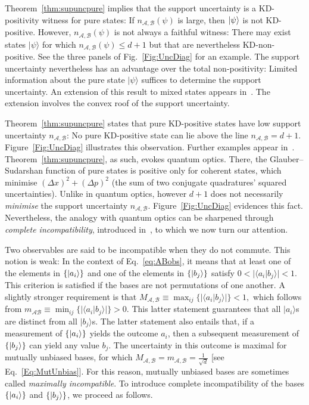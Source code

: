 \documentclass[%
 reprint,
superscriptaddress,
nofootinbib,
bibnotes,
 amsmath,amssymb,
 aps,
]{revtex4-1}
\theoremstyle{plain}
\newcommand{\cket}[1]{|#1\rangle}
\newcommand{\Acal}{{\mathcal A}}
\newcommand{\Bcal}{{\mathcal B}}
\newcommand{\nab}{n_{\Acal,\Bcal}}
\newcommand{\mab}{m_{\Acal,\Bcal}}
\newcommand{\Mab}{M_{\Acal, \Bcal}}
\begin{document}
Theorem~\ref{thm:supuncpure} implies that the support uncertainty is a KD-positivity witness for pure states: If  $\nab (\psi)$ is large, then $\ket{\psi}$ is not KD-positive.  However, $\nab (\psi)$ is not always a faithful witness: There may exist states $|\psi\rangle$ for which $\nab(\psi)\leq d+ 1$ but that are nevertheless KD-non-positive. See the three panels of Fig.~\ref{Fig:UncDiag} for an example. The support uncertainty nevertheless has an advantage over the total non-positivity: Limited information about the pure state $\cket{\psi}$ suffices to determine the support uncertainty. 
An extension of this result to mixed states appears in~\cite{ArvDeBLan24}. The extension involves the convex roof of the support uncertainty.


Theorem~\ref{thm:supuncpure}  states  that pure KD-positive states have low support uncertainty $\nab$: No pure KD-positive state can lie above the line $\nab=d+1$.  Figure~\ref{Fig:UncDiag} illustrates this observation. Further examples appear in~\cite{DeBievre2021,debievre2023}. Theorem~\ref{thm:supuncpure}, as such, evokes quantum optics. There, the Glauber--Sudarshan function of pure states is positive only for coherent states, which minimise $(\Delta x)^2+(\Delta p)^2$ (the sum of two conjugate quadratures' squared uncertainties).  
Unlike in quantum optics, however $d+1$ does not necessarily \emph{minimise} the support uncertainty $\nab$. 
Figure~\ref{Fig:UncDiag} evidences this fact.
Nevertheless, the analogy with quantum optics can be sharpened through \emph{complete incompatibility}, introduced in~\cite{DeBievre2021,debievre2023}, to which we now turn our attention.

Two observables are said to be incompatible when they do not commute. This notion is weak: In the context of Eq.~\eqref{eq:ABobs}, it means that at least one of the elements in $\{ \ket{a_i} \}$ and one of the elements in $\{ \ket{b_j} \}$ satisfy $0<|\langle a_i|b_j\rangle|<1$. This criterion is satisfied if the bases are not permutations of one another. A slightly stronger requirement is that 
$M_{\Acal, \Bcal} \equiv \max_{ij}  \{ |\langle a_i|b_j\rangle| \} <1,$
which follows from
$m_{\Acal \Bcal} \equiv \min_{ij} \{ |\langle a_i|b_j\rangle| \} >0.$
This latter statement guarantees that all $|a_i\rangle$s are distinct from all $|b_j\rangle$s. 
The latter statement also entails that, if a measurement of $\{ \ket{a_i} \}$ yields the outcome $a_i$, then a subsequent measurement of $\{ \ket{b_j} \}$ can yield any value $b_j$. The uncertainty in this outcome is maximal for  mutually unbiased bases, for which $\Mab = \mab=\frac{1}{\sqrt d}$ [see Eq.~\eqref{Eq:MutUnbias}]. For this reason, mutually unbiased bases are sometimes called \emph{maximally incompatible}. To introduce complete incompatibility of the  bases $\{ \ket{a_i} \}$ and $\{ \ket{b_j} \}$,  we proceed as follows.
\end{document}
